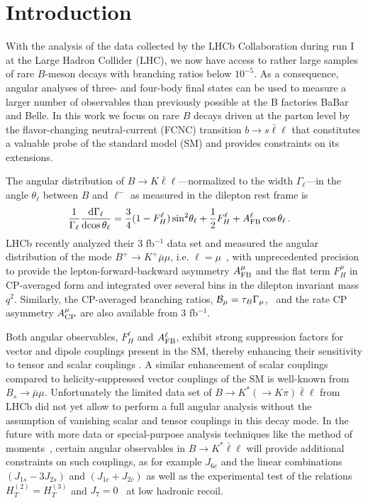 \documentclass[twocolumn,epjc3]{svjour3}
\numberwithin{equation}{section}
\newcommand{\checked}[1]{{\color{brown}{ {\bf Checked: }{#1}}}}
\renewcommand{\checked}[1]{#1}
\renewcommand{\[}{\big[}
\renewcommand{\]}{\big]}
\renewcommand{\(}{\big(}
\renewcommand{\)}{\big)}
\begin{document}
%
%
%
\section{
 \checked{ Introduction}
}

With the analysis of the data collected by the LHCb Collaboration
during run I at the Large Hadron Collider (LHC), we now have access to
rather large samples of rare $B$-meson decays with branching ratios
below $10^{-5}$. As a consequence, angular analyses of three- and
four-body final states can be used to measure a larger number of
observables than previously possible at the B factories BaBar and
Belle. In this work we focus on rare $B$ decays driven at the parton
level by the flavor-changing neutral-current (FCNC) transition $b\to s
\bar\ell\ell$ that constitutes a valuable probe of the standard model
(SM) and provides constraints on its extensions.

The angular distribution of $B\to K \bar\ell\ell$---normalized to the
width $\Gamma_\ell$---in the angle $\theta_\ell$ between $B$ and
$\ell^-$ as measured in the dilepton rest frame is
\begin{align}
  \label{eq:ang-distr}
  \frac{1}{\Gamma_\ell} \frac{\mbox{d}\Gamma_{\ell}}{\mbox{d}\!\cos\theta_\ell} &
  = \frac{3}{4} (1 - F_H^\ell) \sin^2\!\theta_\ell
  + \frac{1}{2} F_H^\ell
  + A_{\rm FB}^\ell \cos\theta_\ell \,.
\end{align}
LHCb recently analyzed their 3 fb$^{-1}$ data set and measured the angular
distribution of the mode $B^+\to K^+ \bar\mu\mu$, i.e. $\ell =
\mu$~\cite{Aaij:2014tfa}, with unprecedented precision to provide the
lepton-forward-backward asymmetry $A_{\rm FB}^\mu$ and the flat term $F_H^\mu$
in CP-averaged form and integrated over several bins in the dilepton invariant
mass $q^2$. Similarly, the CP-averaged branching ratios, ${\cal B}_\mu =
\tau_{B} \Gamma_\mu$,~\cite{Aaij:2014pli} and the rate CP asymmetry $A_{\rm
  CP}^\mu$ \cite{Aaij:2014bsa} are also available from 3 fb$^{-1}$.

Both {angular} observables, $F_H^\ell$ and $A_{\rm FB}^\ell$, exhibit strong suppression
factors for vector and dipole couplings present in the SM, thereby enhancing
their sensitivity to tensor and scalar couplings \cite{Bobeth:2007dw,
  Bobeth:2012vn}. A similar enhancement of scalar couplings compared to
helicity-suppressed vector couplings of the SM is well-known from $B_s\to
\bar\mu\mu$. Unfortunately the limited data set of $B\to K^*(\to K\pi)
\bar\ell\ell$ from LHCb \cite{Aaij:2013qta} {did not yet} allow to perform a full
angular analysis without the assumption of vanishing scalar and tensor couplings
in this decay mode. In the future with more data or special-purpose analysis
techniques like the method of moments~\cite{beaujean:2015mom}, certain angular
observables in $B\to K^* \bar\ell\ell$ will provide additional constraints on
such couplings, as for example $J_{6c}$ \cite{Altmannshofer:2008dz} and the
linear combinations $(J_{1s} - 3 J_{2s})$ and $(J_{1c} + J_{2c})$
\cite{Matias:2012xw, Bobeth:2012vn} as well as the experimental test of the
relations $H_T^{(2)} = H_T^{(3)}$ and $J_7 = 0$~\cite{Bobeth:2012vn} at low
hadronic recoil.
\end{document}

